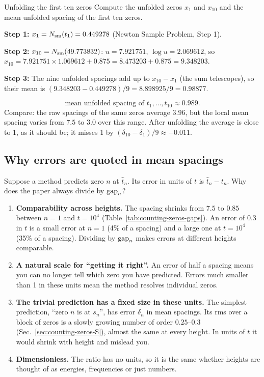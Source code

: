 \begin{sample}{Unfolding the first ten zeros}
Compute the unfolded zeros $x_1$ and $x_{10}$ and the mean unfolded spacing of the first ten zeros.

\textbf{Step 1:} $x_1=N_{\mathrm{sm}}(t_1)=0.449278$ (Newton Sample Problem, Step 1).

\textbf{Step 2:} $x_{10}=N_{\mathrm{sm}}(49.773832)$: $u=7.921751$, $\log u=2.069612$, so $x_{10}=7.921751\times1.069612+0.875=8.473203+0.875=9.348203$.

\textbf{Step 3:} The nine unfolded spacings add up to $x_{10}-x_1$ (the sum telescopes), so their mean is $(9.348203-0.449278)/9=8.898925/9=0.98877$.

\[
\boxed{\text{mean unfolded spacing of }t_1,\dots,t_{10}\approx0.989.}
\]
Compare: the raw spacings of the same zeros average $3.96$, but the local mean spacing varies from $7.5$ to $3.0$ over this range. After unfolding the average is close to 1, as it should be; it misses 1 by $(\delta_{10}-\delta_1)/9\approx-0.011$.
\end{sample}

\subsection{Why errors are quoted in mean spacings}

Suppose a method predicts zero $n$ at $\hat t_n$. Its error in units of $t$ is $\hat t_n-t_n$. Why does the paper always divide by $\mathrm{gap}_n$?

\begin{enumerate}
\item \textbf{Comparability across heights.} The spacing shrinks from $7.5$ to $0.85$ between $n=1$ and $t=10^4$ (Table~\ref{tab:counting-zeros-gaps}). An error of $0.3$ in $t$ is a small error at $n=1$ (4\% of a spacing) and a large one at $t=10^4$ (35\% of a spacing). Dividing by $\mathrm{gap}_n$ makes errors at different heights comparable.
\item \textbf{A natural scale for ``getting it right''.} An error of half a spacing means you can no longer tell which zero you have predicted. Errors much smaller than 1 in these units mean the method resolves individual zeros.
\item \textbf{The trivial prediction has a fixed size in these units.} The simplest prediction, ``zero $n$ is at $s_n$'', has error $\delta_n$ in mean spacings. Its rms over a block of zeros is a slowly growing number of order $0.25$--$0.3$ (Sec.~\ref{sec:counting-zeros-S}), almost the same at every height. In units of $t$ it would shrink with height and mislead you.
\item \textbf{Dimensionless.} The ratio has no units, so it is the same whether heights are thought of as energies, frequencies or just numbers.
\end{enumerate}

